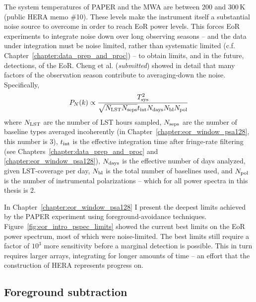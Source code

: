 The system temperatures of PAPER and the MWA are between 200 and 300\,K (public HERA memo \#10). These levels make the instrument itself a substantial noise source to overcome in order to reach EoR power levels. This forces EoR experiments to integrate noise down over long observing seasons -- and the data under integration must be noise limited, rather than systematic limited (c.f. Chapter~\ref{chapter:data_prep_and_proc}) -- to obtain limits, and in the future, detections, of the EoR. Cheng et al. (\textit{submitted}) showed in detail that many factors of the observation season contribute to averaging-down the noise. Specifically,
\begin{equation}
P_N(k) \propto \frac{T_{\rm sys}^2}{\sqrt{N_{\rm LST} N_{\rm seps}} t_{\rm int} N_{\rm days} N_{\rm bl} N_{\rm pol}} 
\end{equation}
where $N_{\rm LST}$ are the number of LST hours sampled, $N_{\rm seps}$ are the number of baseline types averaged incoherently (in Chapter~\ref{chapter:eor_window_psa128}, this number is 3),  $t_{\rm int}$ is the effective integration time after fringe-rate filtering (see Chapters~\ref{chapter:data_prep_and_proc} and \ref{chapter:eor_window_psa128}), $N_{\rm days}$ is the effective number of days analyzed, given LST-coverage per day, $N_{\rm bl}$ is the total number of baselines used, and $N_{\rm pol}$ is the number of instrumental polarizations -- which for all power spectra in this thesis is 2.

In Chapter~\ref{chapter:eor_window_psa128} I present the deepest limits achieved by the PAPER experiment using foreground-avoidance techniques. Figure~\ref{fig:eor_intro_pspec_limits} showed the current best limits on the EoR power spectrum, most of which were noise-limited. The best limits still require a factor of $10^3$ more sensitivity before a marginal detection is possible. This in turn requires larger arrays, integrating for longer amounts of time -- an effort that the construction of HERA represents progress on.

\subsection{Foreground subtraction}

